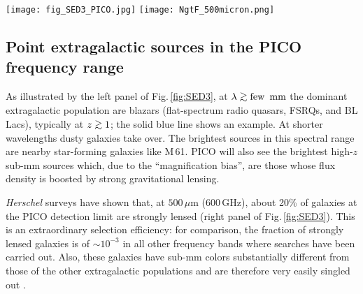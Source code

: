 \documentclass[11pt,a4paper]{article}
\def\simgt{\mathrel{\rlap{\lower 3pt\hbox{$\sim$}} \raise2.0pt\hbox{$>$}}}
\begin{document}







\def\mission{CMB Probe\ }




\begin{figure*}
\begin{center}
\texttt{[image: fig\_SED3\_PICO.jpg]}
\texttt{[image: NgtF\_500micron.png]}
\caption{\textbf{Left panel.} Examples of SEDs of extragalactic sources detectable by PICO, compared with its point source detection limits (solid black line). The SED of M\,61 has been scaled down by a factor of 10. The 90\% completeness limits of the Second \textit{Planck} Catalogue of Compact Sources (PCCS2; \cite{PCCS2}) are also shown.  \textbf{Right panel.} Integral counts of the various populations of extragalactic sources at $500\,\mu$m as determined by \textit{Herschel} surveys. The vertical red line shows the estimated PICO detection limit.}
\label{fig:SED3}
\end{center}
\end{figure*}

\subsection{Point extragalactic sources in the PICO frequency range}

As illustrated by the left panel of Fig.\,\ref{fig:SED3}, at $\lambda \simgt \hbox{few\, mm}$ the dominant extragalactic population are blazars (flat-spectrum radio quasars, FSRQs, and BL Lacs), typically at $z\simgt 1$; the solid blue line shows an example. At shorter wavelengths dusty galaxies take over. The brightest sources in this spectral range are nearby  star-forming galaxies like M\,61. PICO will also see the brightest high-$z$ sub-mm sources which, due to the ``magnification bias'', are those whose flux density is boosted by strong gravitational lensing.

\textit{Herschel} surveys have shown that, at $500\,\mu$m (600\,GHz), about 20\% of galaxies at the PICO detection limit are strongly lensed (right panel of Fig.\,\ref{fig:SED3}). This is an extraordinary selection efficiency: for   comparison, the fraction of strongly lensed galaxies is of $\sim 10^{-3}$ in all other frequency bands where searches have been carried out. Also, these galaxies have sub-mm colors substantially different from those of the other extragalactic populations and are therefore very easily singled out \cite{Negrello2017lensed}.
\end{document}
